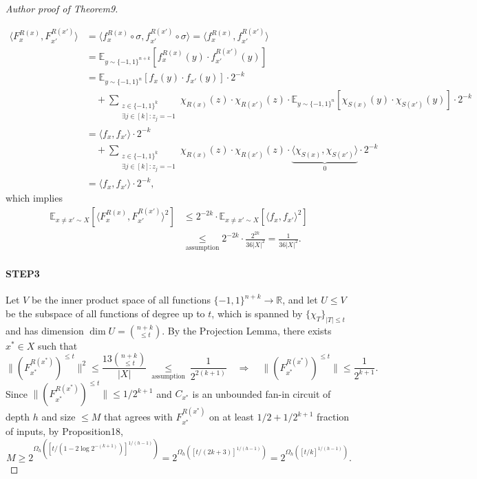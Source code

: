 \documentclass[10pt,a4paper]{article}
\begin{document}
\begin{proof}[Author proof of Theorem9]
\begin{itemize}
\begin{align*}\langle F_x^{R(x)},F_{x'}^{R(x')}\rangle&=\langle f_x^{R(x)}\circ\sigma,f_{x'}^{R(x')}\circ\sigma\rangle=\langle f_x^{R(x)},f_{x'}^{R(x')}\rangle\\&=\mathbb E_{y\sim\{-1,1\}^{n+k}}[f_x^{R(x)}(y)\cdot f_{x'}^{R(x')}(y)]\\&=\mathbb E_{y\sim\{-1,1\}^n}[f_x(y)\cdot f_{x'}(y)]\cdot2^{-k}\\&\quad+\sum_{\substack{z\in\{-1,1\}^k\\\exists j\in[k]:z_j=-1}}\chi_{R(x)}(z)\cdot\chi_{R(x')}(z)\cdot\mathbb E_{y\sim\{-1,1\}^n}[\chi_{S(x)}(y)\cdot\chi_{S(x')}(y)]\cdot2^{-k}\\&=\langle f_x,f_{x'}\rangle\cdot2^{-k}\\&\quad+\sum_{\substack{z\in\{-1,1\}^k\\\exists j\in[k]:z_j=-1}}\chi_{R(x)}(z)\cdot\chi_{R(x')}(z)\cdot\underbrace{\langle\chi_{S(x)},\chi_{S(x')}\rangle}_{0}\cdot2^{-k}\\&=\langle f_x,f_{x'}\rangle\cdot2^{-k},\end{align*}
which implies
\begin{align*}\mathbb E_{x\ne x'\sim X}[\langle F_x^{R(x)},F_{x'}^{R(x')}\rangle^2]&\leq2^{-2k}\cdot\mathbb E_{x\ne x'\sim X}[\langle f_x,f_{x'}\rangle^2]\\&\underset{\text{assumption}}\leq2^{-2k}\cdot\frac{2^{2k}}{36|X|^2}=\frac1{36|X|^2}.\end{align*}
\end{itemize}
\paragraph{STEP3}
Let $V$ be the inner product space of all functions $\{-1,1\}^{n+k}\to\mathbb R$, and let $U\leq V$ be the subspace of all functions of degree up to $t$, which is spanned by $\{\chi_T\}_{|T|\leq t}$ and has dimension $\dim U=\binom{n+k}{\leq t}$. By the Projection Lemma, there exists $x^*\in X$ such that
\[\|(F_{x^*}^{R(x^*)})^{\leq t}\|^2\leq\frac{13\binom{n+k}{\leq t}}{|X|}\ \underset{\text{assumption}}\leq\ \frac1{2^{2(k+1)}}\quad\Longrightarrow\quad\|(F_{x^*}^{R(x^*)})^{\leq t}\|\leq\frac1{2^{k+1}}.\]
Since $\|(F_{x^*}^{R(x^*)})^{\leq t}\|\leq1/2^{k+1}$ and $C_{x^*}$ is an unbounded fan-in circuit of depth $h$ and size $\leq M$ that agrees with $F_{x^*}^{R(x^*)}$ on at least $1/2+1/2^{k+1}$ fraction of inputs, by Proposition18,
\[M\geq2^{\Omega_h([t/(1-2\log2^{-(k+1)})]^{1/(h-1)})}=2^{\Omega_h([t/(2k+3)]^{1/(h-1)})}=2^{\Omega_h([t/k]^{1/(h-1)})}.\]
\end{proof}
\end{document}

